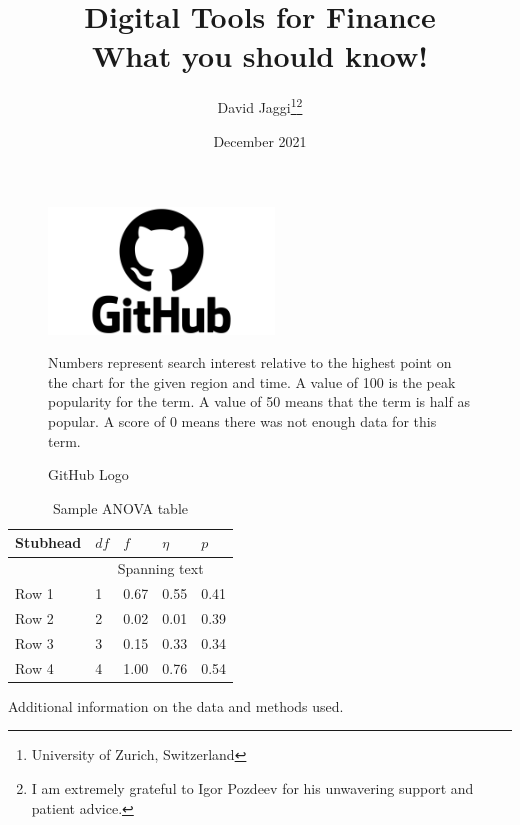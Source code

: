 \documentclass[10pt,a4paper]{article}
\title{%
  Digital Tools for Finance \\
  \large What you should know!}
\author{David Jaggi\thanks{University of Zurich, Switzerland}\;\thanks{I am extremely grateful to Igor Pozdeev for his unwavering support and patient advice.}}
\date{December 2021}
\begin{document}
\maketitle
\begin{abstract}
    \blindtext
\end{abstract}
\newpage
\blindtext[3]
\textcite{gormsenCoronavirusImpactStock2020}
\begin{figure}[h!]%
    \centering
    \includegraphics[width=6cm]{text/paper/github_logo.png}%
    \caption{GitHub Logo}%
    \footnotesize Numbers represent search interest relative to the highest point on the chart for the given region and time. A value of 100 is the peak popularity for the term. A value of 50 means that the term is half as popular. A score of 0 means there was not enough data for this term.
    \label{fig:github_logo}%
\end{figure}
\blindtext[3]
\textcite{kozlowskiTailThatWags2020}
\begin{table}
    \centering  
  \begin{threeparttable}
    \caption{Sample ANOVA table}
     \begin{tabular}{lllll}
        \toprule
        Stubhead & \( df \) & \( f \) & \( \eta \) & \( p \) \\
        \midrule
                 &     \multicolumn{4}{c}{Spanning text}     \\
        Row 1    & 1        & 0.67    & 0.55       & 0.41    \\
        Row 2    & 2        & 0.02    & 0.01       & 0.39    \\
        Row 3    & 3        & 0.15    & 0.33       & 0.34    \\
        Row 4    & 4        & 1.00    & 0.76       & 0.54    \\
        \bottomrule
     \end{tabular}
    \begin{tablenotes}
      \small
      \item Additional information on the data and methods used.
    \end{tablenotes}
  \end{threeparttable}
\end{table}
\blindtext[4]
\printbibliography
\end{document}
